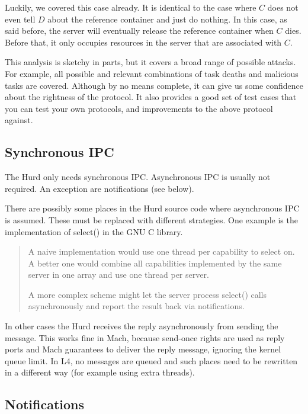 \documentclass[9pt,a4paper]{extarticle}
\newenvironment{comment}{\footnotesize \begin{quote}}{\end{quote}}
\begin{document}
Luckily, we covered this case already.  It is identical to the case
where $C$ does not even tell $D$ about the reference container and
just do nothing.  In this case, as said before, the server will
eventually release the reference container when $C$ dies.  Before
that, it only occupies resources in the server that are associated
with $C$.

This analysis is sketchy in parts, but it covers a broad range of
possible attacks.  For example, all possible and relevant combinations
of task deaths and malicious tasks are covered.  Although by no means
complete, it can give us some confidence about the rightness of the
protocol.  It also provides a good set of test cases that you can test
your own protocols, and improvements to the above protocol against.


\subsection{Synchronous IPC}

The Hurd only needs synchronous IPC.  Asynchronous IPC is usually not
required.  An exception are notifications (see below).

There are possibly some places in the Hurd source code where
asynchronous IPC is assumed.  These must be replaced with different
strategies.  One example is the implementation of select() in the GNU
C library.

\begin{comment}
  A naive implementation would use one thread per capability to select
  on.  A better one would combine all capabilities implemented by the
  same server in one array and use one thread per server.
  
  A more complex scheme might let the server process select() calls
  asynchronously and report the result back via notifications.
\end{comment}

In other cases the Hurd receives the reply asynchronously from sending
the message.  This works fine in Mach, because send-once rights are
used as reply ports and Mach guarantees to deliver the reply message,
ignoring the kernel queue limit.  In L4, no messages are queued and
such places need to be rewritten in a different way (for example using
extra threads).


\subsection{Notifications}
\end{document}
